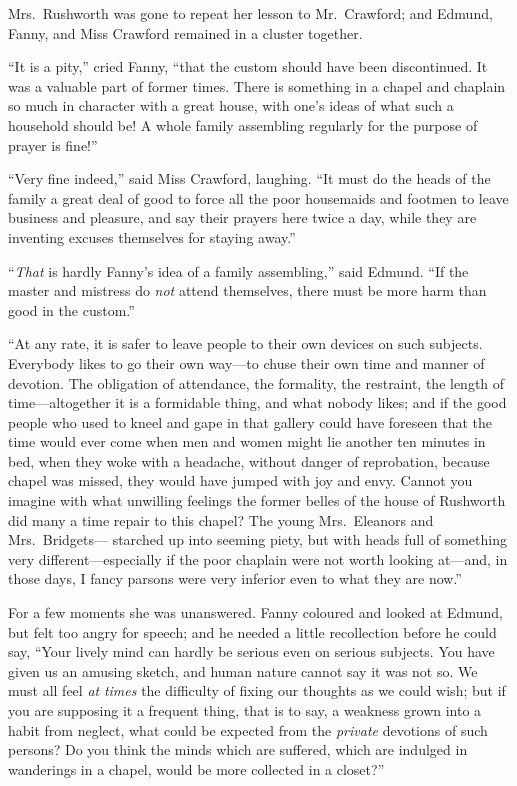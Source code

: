 Mrs.\ Rushworth was gone to repeat her lesson to Mr.\ Crawford;
and Edmund, Fanny, and Miss Crawford remained in a cluster
together.

``It is a pity,'' cried Fanny, ``that the custom should have
been discontinued.  It was a valuable part of former times.
There is something in a chapel and chaplain so much
in character with a great house, with one's ideas of what
such a household should be!  A whole family assembling
regularly for the purpose of prayer is fine!''

``Very fine indeed,'' said Miss Crawford, laughing.  ``It must
do the heads of the family a great deal of good to force
all the poor housemaids and footmen to leave business
and pleasure, and say their prayers here twice a day,
while they are inventing excuses themselves for staying
away.''

``\emph{That} is hardly Fanny's idea of a family assembling,''
said Edmund.  ``If the master and mistress do \emph{not}
attend themselves, there must be more harm than good
in the custom.''

``At any rate, it is safer to leave people to their own
devices on such subjects.  Everybody likes to go their
own way---to chuse their own time and manner of devotion.
The obligation of attendance, the formality, the restraint,
the length of time---altogether it is a formidable thing,
and what nobody likes; and if the good people who used
to kneel and gape in that gallery could have foreseen
that the time would ever come when men and women might lie
another ten minutes in bed, when they woke with a headache,
without danger of reprobation, because chapel was missed,
they would have jumped with joy and envy.  Cannot you
imagine with what unwilling feelings the former belles
of the house of Rushworth did many a time repair to
this chapel?  The young Mrs.\ Eleanors and Mrs.\ Bridgets---%
starched up into seeming piety, but with heads full
of something very different---especially if the poor
chaplain were not worth looking at---and, in those days,
I fancy parsons were very inferior even to what they
are now.''

For a few moments she was unanswered.  Fanny coloured
and looked at Edmund, but felt too angry for speech;
and he needed a little recollection before he could say,
``Your lively mind can hardly be serious even on serious subjects.
You have given us an amusing sketch, and human nature
cannot say it was not so.  We must all feel \emph{at} \emph{times}
the difficulty of fixing our thoughts as we could wish;
but if you are supposing it a frequent thing, that is to say,
a weakness grown into a habit from neglect, what could
be expected from the \emph{private} devotions of such persons?
Do you think the minds which are suffered, which are
indulged in wanderings in a chapel, would be more collected
in a closet?''

